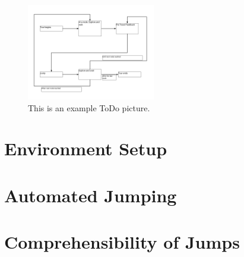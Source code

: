 \begin{figure}[]
	\centering
	\includegraphics[width=0.5\textwidth]{images/interaction-design-steps.png}
	\caption{This is an example ToDo picture.}
	\label{fig:interaction-design-steps}
\end{figure}
\section{Environment Setup}
\label{section AGJN: Environment Setup}
\section{Automated Jumping}
\label{section AGJN: Automated Jumping}
\section{Comprehensibility of Jumps}
\label{section AGJN: Comprehensibility of Jumps}